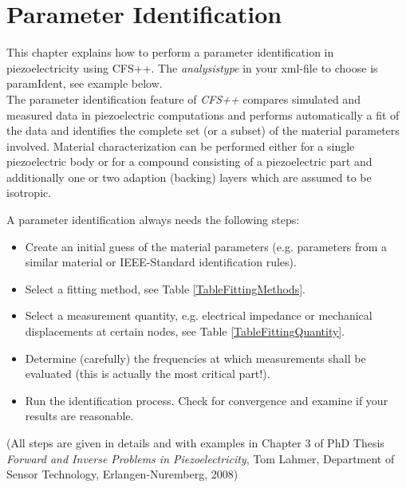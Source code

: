 \chapter{Parameter Identification} \label{paramIdent}
%
%
This chapter explains how to perform a parameter identification in piezoelectricity using CFS++. 
The {\it analysistype} in your xml-file to choose is paramIdent, see example below.\\


The parameter identification feature of {\it CFS++} compares simulated and measured data in piezoelectric computations and performs automatically a fit of the data and identifies the complete set (or a subset) of the material parameters involved.
Material characterization can be performed either for a single piezoelectric body or for a compound consisting of a piezoelectric part and additionally one or two adaption (backing) layers which are assumed to be isotropic.

A parameter identification always needs the following steps:
\begin{itemize}
\item Create an initial guess of the material parameters (e.g. parameters from a similar material or IEEE-Standard identification rules). 
\item Select a fitting method, see Table \ref{TableFittingMethods}.
\item Select a measurement quantity, e.g. electrical impedance or mechanical displacements at certain nodes, see Table \ref{TableFittingQuantity}.
\item Determine (carefully) the frequencies at which measurements shall be evaluated (this is actually the most critical part!).
\item Run the identification process. Check for convergence and examine if your results are reasonable.
\end{itemize}
 (All steps are given in details and with examples in Chapter 3 of PhD Thesis {\it Forward and Inverse Problems in Piezoelectricity}, Tom Lahmer, Department of Sensor Technology, Erlangen-Nuremberg, 2008)\\ \newpage

